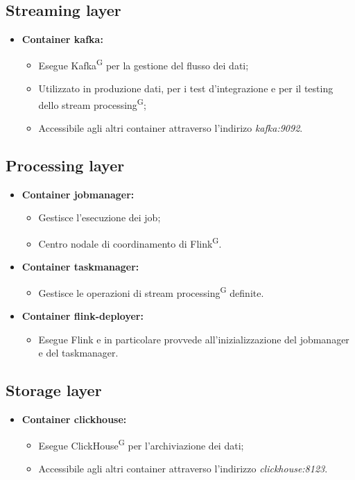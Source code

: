 \documentclass[8pt]{article}
\newcommand{\glossterm}[1]{#1\textsuperscript{G}} %
\begin{document}
\subsection{Streaming layer}
\begin{itemize}
	\setlength\itemsep{0em}
    \item \textbf{Container kafka:}
    \begin{itemize}
	\setlength\itemsep{0em}
        \item Esegue \glossterm{Kafka} per la gestione del flusso dei dati;
        \item Utilizzato in produzione dati, per i test d'integrazione e per il testing dello \glossterm{stream processing};
        \item Accessibile agli altri container attraverso l'indirizo \textit{kafka:9092}.
    \end{itemize}
\end{itemize}
\subsection{Processing layer}
\begin{itemize}
	\setlength\itemsep{0em}
    \item \textbf{Container jobmanager:}
    \begin{itemize}
	\setlength\itemsep{0em}
        \item Gestisce l'esecuzione dei job;
        \item Centro nodale di coordinamento di \glossterm{Flink}.
    \end{itemize}
    \item \textbf{Container taskmanager:}
    \begin{itemize}
	\setlength\itemsep{0em}
        \item Gestisce le operazioni di \glossterm{stream processing} definite.
    \end{itemize}
    \item \textbf{Container flink-deployer:}
    \begin{itemize}
	\setlength\itemsep{0em}
        \item Esegue Flink e in particolare provvede all'inizializzazione del jobmanager e del taskmanager.
    \end{itemize}
\end{itemize}
\subsection{Storage layer}
\begin{itemize}
	\setlength\itemsep{0em}
    \item \textbf{Container clickhouse:}
    \begin{itemize}
	\setlength\itemsep{0em}
        \item Esegue \glossterm{ClickHouse} per l'archiviazione dei dati;
        \item Accessibile agli altri container attraverso l'indirizzo \textit{clickhouse:8123}.
    \end{itemize}
\end{itemize}
\end{document}
